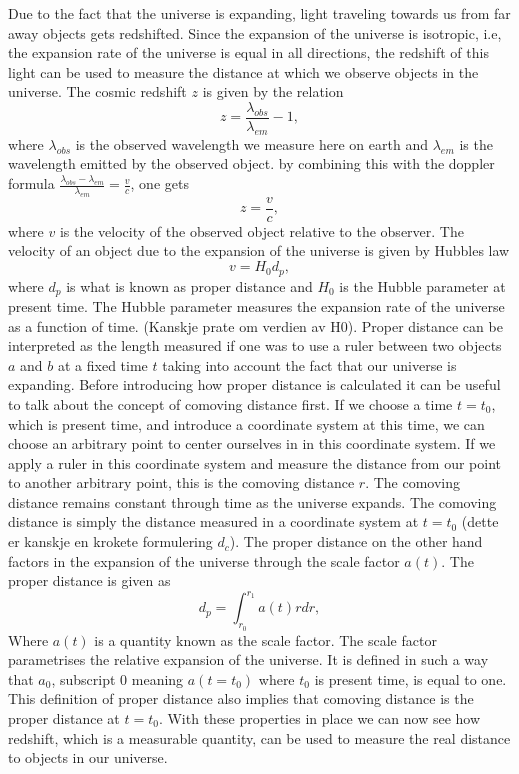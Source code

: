 Due to the fact that the universe is expanding, light traveling towards us from
far away objects gets redshifted. Since the expansion of the universe is
isotropic, i.e, the expansion rate of the universe is equal in all directions,
the redshift of this light can be used to measure the distance at which we
observe objects in the universe. The cosmic redshift $z$ is given by the
relation
\begin{equation}
    z = \frac{\lambda_{obs}}{\lambda_{em}} - 1,
\end{equation}
where $\lambda_{obs}$ is the observed wavelength we measure here on earth and
$\lambda_{em}$ is the wavelength emitted by the observed object. by combining this with the doppler formula
$\frac{\lambda_{obs}-\lambda_{em}}{\lambda_{em}} = \frac{v}{c}$, one gets
\begin{equation}
    z = \frac{v}{c},
\end{equation}
where $v$ is the velocity of the observed object relative to the observer. The
velocity of an object due to the expansion of the universe is given by Hubbles law
\begin{equation}
    v = H_0 d_p,
\end{equation}
where $d_p$ is what is known as proper distance and $H_0$ is the Hubble
parameter at present time. The Hubble parameter measures the expansion rate of
the universe as a function of time. (Kanskje prate om verdien av H0). Proper distance can be interpreted as the length measured if one
was to use a ruler between two objects $a$ and $b$ at a fixed time $t$ taking
into account the fact that our universe is expanding. Before introducing how proper distance is calculated it can be
useful to talk about the concept of comoving distance first. If we choose a time
$t=t_0$, which is present time, and introduce a coordinate system at this time,
we can choose an arbitrary point to center ourselves in in this coordinate
system. If we apply a ruler in this coordinate system and measure the distance
from our point to another arbitrary point, this is the comoving distance $r$.
The comoving distance remains constant through time as the universe expands. The
comoving distance is simply the distance measured in a coordinate system at
$t=t_0$ (dette er kanskje en krokete formulering $d_c$). The proper distance on the other hand factors in the expansion of the
universe through the scale factor $a(t)$. The proper distance is given as
\begin{equation}
    d_p = \int_{r_0}^{r_1}a(t)rdr,
\end{equation}
Where $a(t)$ is a quantity known as the scale factor. The scale factor parametrises the relative expansion of the
universe. It is defined in such a way that $a_0$, subscript $0$ meaning
$a(t=t_0)$ where $t_0$ is present time, is equal to one. This definition of
proper distance also implies that comoving distance is the proper distance at $t=t_0$.
With these properties in place we can now see how redshift, which is a
measurable quantity, can be used to measure the real distance to objects in our universe.


